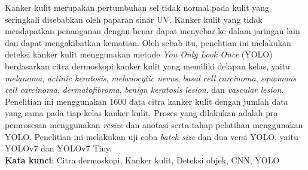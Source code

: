 \documentclass[]{mathuinsa}
\begin{document}
    \newpage{}
    \begin{onehalfspacing}\listoftables\end{onehalfspacing}


    \newpage{}
    \begin{onehalfspacing}\listoffigures\end{onehalfspacing}


    \begin{abstractind}
        Kanker kulit merupakan pertumbuhan sel tidak normal pada kulit yang seringkali disebabkan oleh paparan sinar UV. Kanker kulit yang tidak mendapatkan penanganan dengan benar dapat menyebar ke dalam jaringan lain dan dapat mengakibatkan kematian. Oleh sebab itu, penelitian ini melakukan deteksi kanker kulit menggunakan metode \textit{You Only Look Once} (YOLO) berdasarkan citra dermoskopi kanker kulit yang memiliki delapan kelas, yaitu \textit{melanoma}, \textit{actinic keratosis}, \textit{melanocytic nevus}, \textit{basal cell carcinoma}, \textit{squamous cell carcinoma}, \textit{dermatofibroma}, \textit{benign keratosis lesion}, dan \textit{vascular lesion}. Penelitian ini menggunakan 1600 data citra kanker kulit dengan jumlah data yang sama pada tiap kelas kanker kulit. Proses yang dilakukan adalah pra-pemrosesan menggunakan \textit{resize} dan anotasi serta tahap pelatihan menggunakan YOLO. Penelitian ini melakukan uji coba \textit{batch size} dan dua versi YOLO, yaitu YOLOv7 dan YOLOv7 Tiny.\\
        \noindent
        \textbf{Kata kunci}: Citra dermoskopi, Kanker kulit, Deteksi objek, CNN, YOLO
    \end{abstractind}
    
\end{document}
